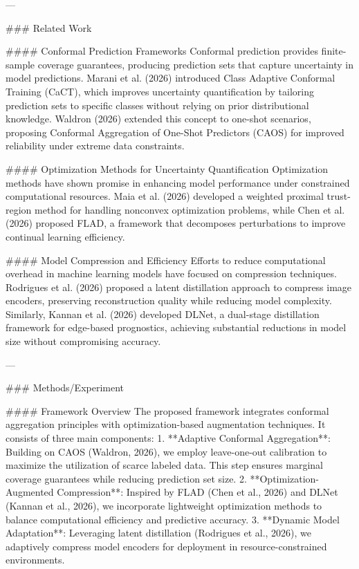 ---

### Related Work

#### Conformal Prediction Frameworks
Conformal prediction provides finite-sample coverage guarantees, producing prediction sets that capture uncertainty in model predictions. Marani et al. (2026) introduced Class Adaptive Conformal Training (CaCT), which improves uncertainty quantification by tailoring prediction sets to specific classes without relying on prior distributional knowledge. Waldron (2026) extended this concept to one-shot scenarios, proposing Conformal Aggregation of One-Shot Predictors (CAOS) for improved reliability under extreme data constraints.

#### Optimization Methods for Uncertainty Quantification
Optimization methods have shown promise in enhancing model performance under constrained computational resources. Maia et al. (2026) developed a weighted proximal trust-region method for handling nonconvex optimization problems, while Chen et al. (2026) proposed FLAD, a framework that decomposes perturbations to improve continual learning efficiency.

#### Model Compression and Efficiency
Efforts to reduce computational overhead in machine learning models have focused on compression techniques. Rodrigues et al. (2026) proposed a latent distillation approach to compress image encoders, preserving reconstruction quality while reducing model complexity. Similarly, Kannan et al. (2026) developed DLNet, a dual-stage distillation framework for edge-based prognostics, achieving substantial reductions in model size without compromising accuracy.

---

### Methods/Experiment

#### Framework Overview
The proposed framework integrates conformal aggregation principles with optimization-based augmentation techniques. It consists of three main components:
1. **Adaptive Conformal Aggregation**: Building on CAOS (Waldron, 2026), we employ leave-one-out calibration to maximize the utilization of scarce labeled data. This step ensures marginal coverage guarantees while reducing prediction set size.
2. **Optimization-Augmented Compression**: Inspired by FLAD (Chen et al., 2026) and DLNet (Kannan et al., 2026), we incorporate lightweight optimization methods to balance computational efficiency and predictive accuracy.
3. **Dynamic Model Adaptation**: Leveraging latent distillation (Rodrigues et al., 2026), we adaptively compress model encoders for deployment in resource-constrained environments.

